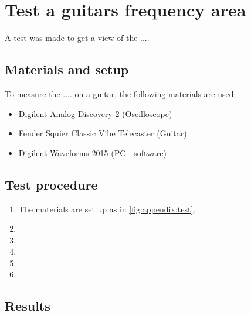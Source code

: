 
\chapter*{Test a guitars frequency area}
A test was made to get a view of the ....

\section*{Materials and setup}
To measure the .... on a guitar, the following materials are used:
\begin{itemize}
\item Digilent Analog Discovery 2 (Oscilloscope)
\item Fender Squier Classic Vibe Telecaster (Guitar)
\item Digilent Waveforms 2015 (PC - software)
\end{itemize}

%

\section*{Test procedure}


\begin{enumerate}
\item The materials are set up as in \autoref{fig:appendix:test}.
\item 
\item  
\item  
\item 
\item 
\end{enumerate}

\section*{Results}


